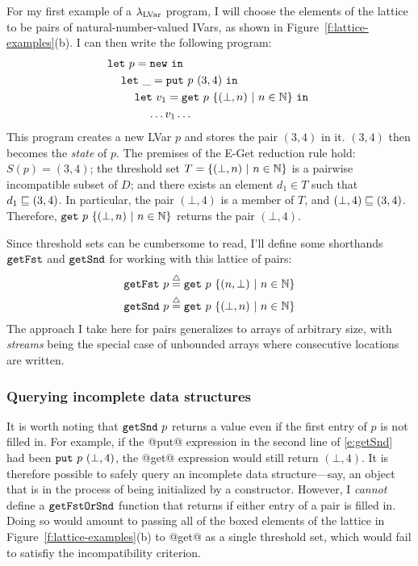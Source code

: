 For my first example of a $\lambda_{\textrm{LVar}}$ program, I will choose the
elements of the lattice to be pairs of natural-number-valued IVars, as
shown in Figure~\ref{f:lattice-examples}(b).  I can then write the
following program:
\begin{equation}
\begin{split}
& \letexp{p}{\NEW}{ \\
& \letspace \letexp{\_}{\putexp{p}{(3,4)}}{ \\
& \letspace \letspace \letexp{v_1}{\getexp{p}{\stateset{(\bot, n) \setsep n \in \mathbb{N}}}}{ \\
& \letspace \letspace \letspace \dots v_1 \dots}}}
\end{split}
\label{e:getSnd}
\end{equation}
This program creates a new LVar $p$ and stores the pair $(3, 4)$ in
it.  $(3,4)$ then becomes the \emph{state} of $p$.  The premises of
the {\sc E-Get} reduction rule hold: $S(p) = (3,4)$; the threshold
set $T = \lbrace (\bot, n) \ | \  n \in \mathbb{N} \rbrace$ is a pairwise
incompatible subset of $D$; and there exists an element $d_1 \in T$
such that $d_1 \sqsubseteq (3,4)$.  In particular, the pair $(\bot, 4)$
is a member of $T$, and $(\bot,4) \sqsubseteq (3,4)$.  Therefore,
$\mbox{\texttt{get}}~p~\lbrace (\bot, n) \ | \  n \in \mathbb{N} \rbrace$ returns
the pair $(\bot,4)$.

Since threshold sets can be cumbersome to read, I'll define some
shorthands $\mbox{\texttt{getFst}}$ and $\mbox{\texttt{getSnd}}$ for working with this lattice of
pairs:
\begin{align*}
\mbox{\texttt{getFst}}~p \stackrel{\triangle}{=} \mbox{\texttt{get}}~p~\lbrace (n, \bot) \ | \  n \in
    \mathbb{N} \rbrace \\
\mbox{\texttt{getSnd}}~p \stackrel{\triangle}{=} \mbox{\texttt{get}}~p~\lbrace (\bot, n) \ | \  n \in
    \mathbb{N} \rbrace
\end{align*}
The approach I take here for pairs generalizes to arrays of arbitrary
size, with \emph{streams} being the special case of unbounded arrays
where consecutive locations are written.

\subsubsection{Querying incomplete data structures}

It is worth noting that $\mbox{\texttt{getSnd}}~p$ returns a value even if the
first entry of $p$ is not filled in.  For example, if the @put@
expression in the second line of \eqref{e:getSnd} had been
$\mbox{\texttt{put}}~p~(\bot,4)$, the @get@ expression would still return
$(\bot,4)$.  It is therefore possible to safely query an incomplete
data structure---say, an object that is in the process of being
initialized by a constructor.  However, I \emph{cannot} define a
$\mbox{\texttt{getFstOrSnd}}$ function that returns if either entry of a pair is
filled in.  Doing so would amount to passing all of the boxed elements
of the lattice in Figure~\ref{f:lattice-examples}(b) to @get@ as a
single threshold set, which would fail to satisfiy the incompatibility
criterion.

